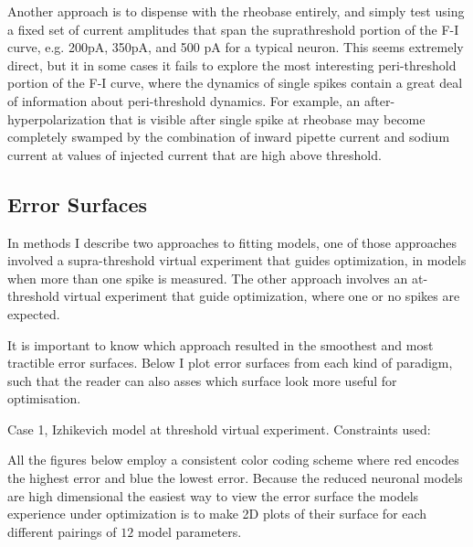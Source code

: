 Another approach is to dispense with the rheobase entirely, and simply test using a fixed set of current amplitudes that span the suprathreshold portion of the F-I curve, e.g. 200pA, 350pA, and 500 pA for a typical neuron.
This seems extremely direct, but it in some cases it fails to explore the most interesting peri-threshold portion of the F-I curve, where the dynamics of single spikes contain a great deal of information about peri-threshold dynamics.
For example, an after-hyperpolarization that is visible after single spike at rheobase may become completely swamped by the combination of inward pipette current and sodium current at values of injected current that are high above threshold.

\subsection{Error Surfaces}
In methods I describe two approaches to fitting models, one of those approaches involved a supra-threshold virtual experiment that guides optimization, in models when more than one spike is measured. The other approach involves an at-threshold virtual experiment that guide optimization, where one or no spikes are expected.

It is important to know which approach resulted in the smoothest and most tractible error surfaces. Below I plot error surfaces from each kind of paradigm, such that the reader can also asses which surface look more useful for optimisation. 

Case 1, Izhikevich model at threshold virtual experiment. Constraints used:
\begin{tabular}{}c}
    TimeConstantTest \\
    RestingPotentialTest \\
    InputResistanceTest \\
    CapacitanceTest \\
    FITest \\
\end{tabular}

All the figures below employ a consistent color coding scheme where red encodes the highest error and blue the lowest error. Because the reduced neuronal models are high dimensional the easiest way to view the error surface the models experience under optimization is to make 2D plots of their surface for each different pairings of $12$ model parameters.



